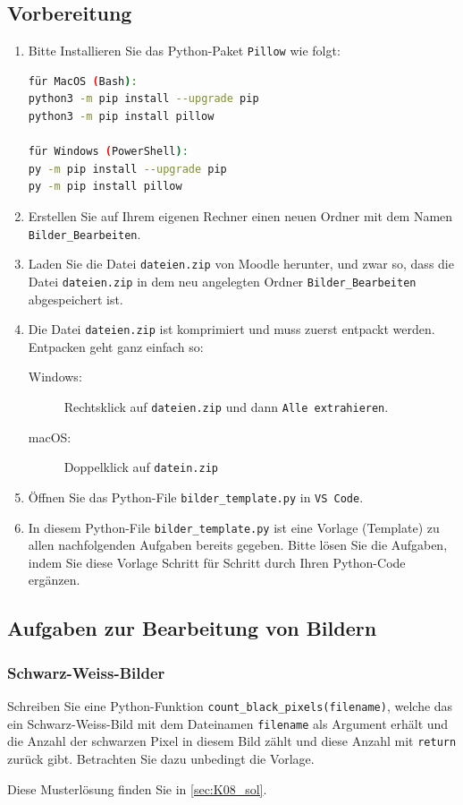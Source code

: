 \subsection{Vorbereitung}
\begin{enumerate}
	\item Bitte Installieren Sie das Python-Paket \texttt{Pillow} wie folgt:
	      \begin{lstlisting}[language=bash, numbers=none]
für MacOS (Bash):
python3 -m pip install --upgrade pip
python3 -m pip install pillow

für Windows (PowerShell):
py -m pip install --upgrade pip
py -m pip install pillow
\end{lstlisting}
	\item Erstellen Sie auf Ihrem eigenen Rechner einen neuen Ordner  mit dem Namen \texttt{Bilder\_Bearbeiten}.
	\item Laden Sie die Datei \texttt{dateien.zip} von Moodle herunter, und zwar so, dass die Datei \texttt{dateien.zip} in dem neu angelegten Ordner \texttt{Bilder\_Bearbeiten} abgespeichert ist.
	\item Die Datei \texttt{dateien.zip} ist komprimiert und muss zuerst entpackt werden. Entpacken geht ganz einfach so:
	      \begin{description}
		      \item[Windows:] Rechtsklick auf \texttt{dateien.zip} und dann \texttt{Alle extrahieren}.
		      \item[macOS:] Doppelklick auf \texttt{datein.zip}
	      \end{description}
	\item Öffnen Sie das Python-File \texttt{bilder\_template.py} in \texttt{VS Code}.
	\item In diesem Python-File \texttt{bilder\_template.py} ist eine Vorlage (Template) zu allen nachfolgenden Aufgaben bereits gegeben. Bitte lösen Sie die Aufgaben, indem Sie diese Vorlage Schritt für Schritt durch Ihren Python-Code ergänzen.
\end{enumerate}

\subsection{Aufgaben zur Bearbeitung von Bildern}
\subsubsection{Schwarz-Weiss-Bilder}
\begin{myexercise}
	Schreiben Sie eine Python-Funktion \lstinline|count_black_pixels(filename)|, welche das ein Schwarz-Weiss-Bild mit dem Dateinamen \lstinline|filename| als Argument erhält und die Anzahl der schwarzen Pixel in diesem Bild zählt und diese Anzahl mit \lstinline|return| zurück gibt. Betrachten Sie dazu unbedingt die Vorlage.
	\begin{myanswer}
		Diese Musterlösung finden Sie in \cref{sec:K08_sol}.
	\end{myanswer}
\end{myexercise}

